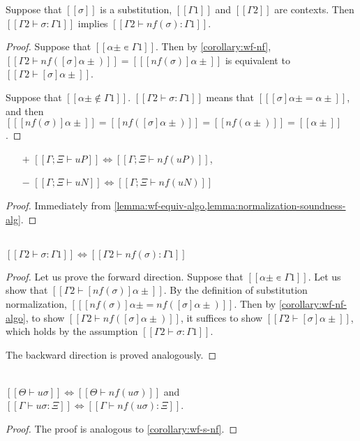 \begin{lemma}
  \label{lemma:norm-subst-sig}
  Suppose that $[[σ]]$ is a substitution, $[[Γ1]]$ and $[[Γ2]]$ are contexts.
  Then $[[Γ2 ⊢ σ : Γ1]]$ implies $[[Γ2 ⊢ nf(σ) : Γ1]]$.
\end{lemma}
\begin{proof}
  Suppose that $[[α± ∊ {Γ1}]]$. 
  Then by \cref{corollary:wf-nf}, $[[Γ2 ⊢ nf([σ]α±)]] = [[ [nf(σ)]α± ]]$ 
  is equivalent to $[[Γ2 ⊢ [σ]α±]]$.

  Suppose that $[[α± ∉ {Γ1}]]$. 
  $[[Γ2 ⊢ σ : Γ1]]$ means that $[[ [σ]α± = α± ]]$, 
  and then $[[ [nf(σ)]α± ]] = [[nf([σ]α±)]] = [[nf(α±)]] = [[α±]]$.
\end{proof}



\begin{corollary}
  \label{corollary:wf-nf-algo}
  \begin{itemize}
    \item[$+$] $[[Γ; Ξ ⊢ uP]] \iff [[Γ; Ξ ⊢ nf(uP)]]$,
    \item[$-$] $[[Γ; Ξ ⊢ uN]] \iff [[Γ; Ξ ⊢ nf(uN)]]$
  \end{itemize}
\end{corollary}
\begin{proof}
  Immediately from \cref{lemma:wf-equiv-algo,lemma:normalization-soundness-alg}.
\end{proof}

\begin{corollary}
  \label{corollary:wf-s-nf}
  \hfill \\
   $[[Γ2 ⊢ σ : Γ1]] \iff [[Γ2 ⊢ nf(σ) : Γ1]]$
\end{corollary}
\begin{proof}
  Let us prove the forward direction.
  Suppose that $[[α± ∊ {Γ1}]]$.  Let us show that $[[Γ2 ⊢ [nf(σ)]α±]]$.
  By the definition of substitution normalization,
  $[[ [nf(σ)]α± = nf([σ]α±) ]]$. Then by \cref{corollary:wf-nf-algo},
  to show $[[Γ2 ⊢ nf([σ]α±)]]$, it suffices to show $[[Γ2 ⊢ [σ]α±]]$,
  which holds by the assumption $[[Γ2 ⊢ σ : Γ1]]$.

  The backward direction is proved analogously.
\end{proof}

\begin{corollary}
  \label{corollary:norm-subst-sig-algo}
  \hfill \\
  $[[Θ ⊢ uσ]] \iff [[Θ ⊢ nf(uσ)]]$ and
  $[[Γ ⊢ uσ : Ξ]] \iff [[Γ ⊢ nf(uσ) : Ξ]]$.
\end{corollary}
\begin{proof}
  The proof is analogous to \cref{corollary:wf-s-nf}.
\end{proof}




